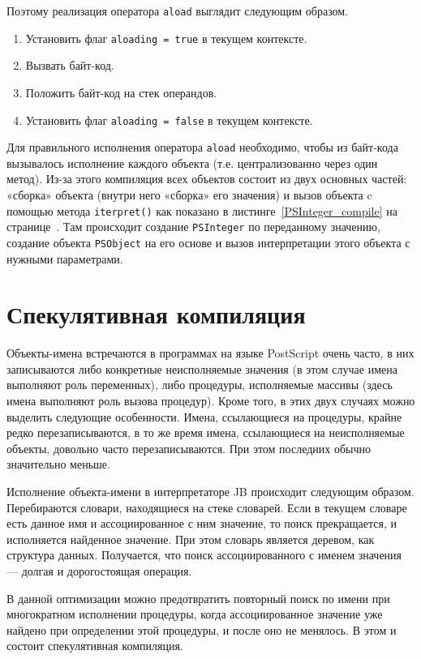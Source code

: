 \documentclass[14pt]{extarticle}
\begin{document}
	Поэтому реализация оператора \texttt{aload} выглядит следующим образом.
	\begin{enumerate}
		\item Установить флаг \texttt{aloading\,=\,true}  в текущем контексте.
		\item Вызвать байт-код.
		\item Положить байт-код на стек операндов.
		\item Установить флаг \texttt{aloading\,=\,false} в текущем контексте.
	\end{enumerate}
	
	Для правильного исполнения оператора \texttt{aload} необходимо, чтобы из байт-кода вызывалось исполнение каждого объекта (т.е. централизованно через один метод). Из-за этого компиляция всех объектов состоит из двух основных частей: «сборка» объекта (внутри него «сборка» его значения) и вызов объекта c помощью метода \texttt{iterpret()} как показано в листинге~\ref{PSInteger_compile} на странице~\pageref{PSInteger_compile}. Там происходит  создание \texttt{PSInteger} по переданному значению, создание объекта \texttt{PSObject} на его основе и вызов интерпретации этого объекта с нужными параметрами. 
	\pagebreak
	\section{Спекулятивная компиляция}
	Объекты-имена встречаются в программах на языке PostScript очень часто, в них записываются либо конкретные неисполняемые значения (в этом случае имена выполняют роль переменных), либо процедуры, исполняемые массивы (здесь имена выполняют роль вызова процедур). Кроме того, в этих двух случаях можно выделить следующие особенности. Имена, ссылающиеся на процедуры, крайне редко перезаписываются, в то же время имена, ссылающиеся на неисполняемые объекты, довольно часто перезаписываются. При этом последних обычно значительно меньше.
	
	Исполнение объекта-имени в интерпретаторе JB происходит следующим образом. Перебираются словари, находящиеся на стеке словарей. Если в текущем словаре есть данное имя и ассоциированное с ним значение, то поиск прекращается, и исполняется найденное значение. При этом словарь является деревом, как структура данных. Получается, что поиск ассоциированного с именем значения --- долгая и дорогостоящая операция. 
	
	В данной оптимизации можно предотвратить повторный поиск по имени при многократном исполнении процедуры, когда  ассоциированное значение уже найдено при определении этой процедуры, и после оно не менялось. В этом и состоит спекулятивная компиляция.
	
\end{document}
